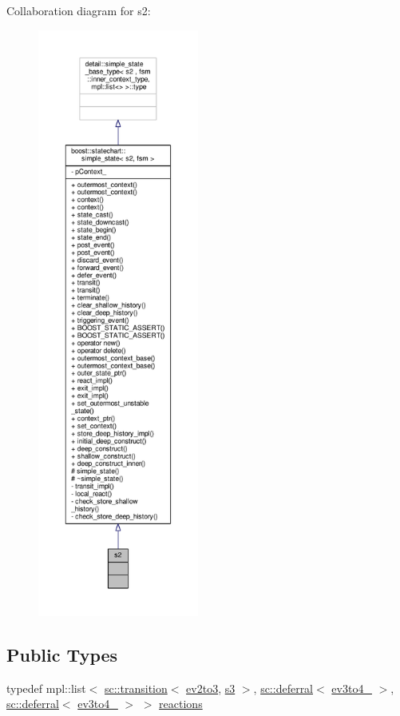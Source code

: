 Collaboration diagram for s2\+:
\nopagebreak
\begin{figure}[H]
\begin{center}
\leavevmode
\includegraphics[height=550pt]{structs2__coll__graph}
\end{center}
\end{figure}
\subsection*{Public Types}
\begin{DoxyCompactItemize}
\item 
typedef mpl\+::list$<$ \mbox{\hyperlink{classboost_1_1statechart_1_1transition}{sc\+::transition}}$<$ \mbox{\hyperlink{structev2to3}{ev2to3}}, \mbox{\hyperlink{structs3}{s3}} $>$, \mbox{\hyperlink{classboost_1_1statechart_1_1deferral}{sc\+::deferral}}$<$ \mbox{\hyperlink{structev3to4__1}{ev3to4\+\_}} $>$, \mbox{\hyperlink{classboost_1_1statechart_1_1deferral}{sc\+::deferral}}$<$ \mbox{\hyperlink{structev3to4__2}{ev3to4\+\_}} $>$ $>$ \mbox{\hyperlink{structs2_a4368425590a18559700f7db59bca5e39}{reactions}}
\end{DoxyCompactItemize}
